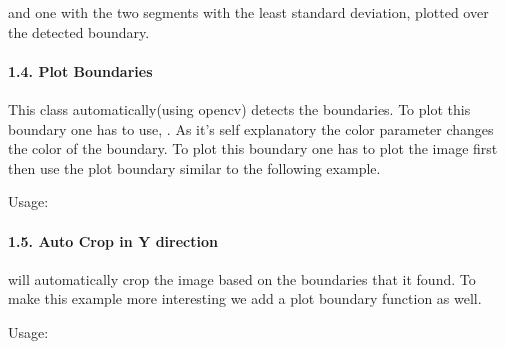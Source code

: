 \documentclass[letterpaper,10pt,english]{sphinxmanual}
\begin{document}
\sphinxAtStartPar
and one with the two segments with the least standard deviation, plotted over the detected boundary.



\paragraph{1.4. Plot Boundaries}
\label{\detokenize{tutorials:plot-boundaries}}
\sphinxAtStartPar
This class automatically(using opencv) detects the boundaries. To plot this boundary
one has to use, . As it’s self explanatory the color
parameter changes the color of the boundary. To plot this boundary one has to plot
the image first then use the plot boundary similar to the following example.

\sphinxAtStartPar
Usage:

\begin{sphinxVerbatim}[commandchars=\\\{\}]
\end{sphinxVerbatim}


\paragraph{1.5. Auto Crop in Y direction}
\label{\detokenize{tutorials:auto-crop-in-y-direction}}
\sphinxAtStartPar
{} will automatically crop the image based on the boundaries that it found.
To make this example more interesting we add a plot boundary function as well.

\sphinxAtStartPar
Usage:

\begin{sphinxVerbatim}[commandchars=\\\{\}]
\end{sphinxVerbatim}
\end{document}
